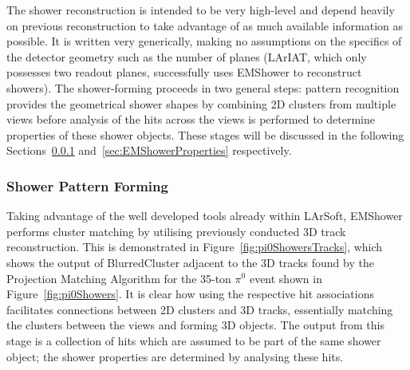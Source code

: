 The shower reconstruction is intended to be very high-level and depend heavily on previous reconstruction to take advantage of as much available information as possible.  It is written very generically, making no assumptions on the specifics of the detector geometry such as the number of planes (LArIAT, which only possesses two readout planes, successfully uses EMShower to reconstruct showers).  The shower-forming proceeds in two general steps: pattern recognition provides the geometrical shower shapes by combining 2D clusters from multiple views before analysis of the hits across the views is performed to determine properties of these shower objects.  These stages will be discussed in the following Sections~\ref{sec:EMShowerPattern} and~\ref{sec:EMShowerProperties} respectively.

\subsubsection{Shower Pattern Forming}\label{sec:EMShowerPattern}

Taking advantage of the well developed tools already within LArSoft, EMShower performs cluster matching by utilising previously conducted 3D track reconstruction.  This is demonstrated in Figure~\ref{fig:pi0ShowersTracks}, which shows the output of BlurredCluster adjacent to the 3D tracks found by the Projection Matching Algorithm for the 35-ton $\pi^0$ event shown in Figure~\ref{fig:pi0Showers}.  It is clear how using the respective hit associations facilitates connections between 2D clusters and 3D tracks, essentially matching the clusters between the views and forming 3D objects.  The output from this stage is a collection of hits which are assumed to be part of the same shower object; the shower properties are determined by analysing these hits.

